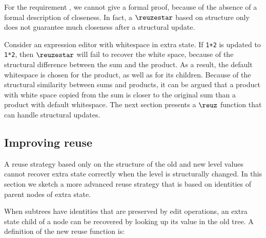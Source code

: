 
For the requirement , we cannot give a formal proof, because of the absence of a formal description of closeness. In fact, a $\reuzestar$ based on structure only does not guarantee much closeness after a structural update.

Consider an expression editor with whitespace in extra state. If \verb|1+2| is updated to \verb|1*2|, then $\reuzestar$ will fail to recover the white space, because of the structural difference between the sum and the product. As a result, the default whitespace is chosen for the product, as well as for its children. Because of the structural similarity between sums and products, it can be argued that a product with white space copied from the sum is closer to the original sum than a product with default whitespace. The next section presents a $\reuz$ function that can handle structural updates.


\subsection{Improving reuse} \label{subsect:reuseid}

A reuse strategy based only on the structure of the old and new level values cannot recover extra state correctly when the level is structurally changed. In this section we sketch a more advanced reuse strategy that is based on identities of parent nodes of extra state.

When subtrees have identities that are preserved by edit operations, an extra state child of a node can be recovered by looking up its value in the old tree. A definition of the new reuse function is:


 

